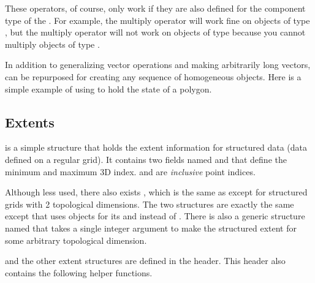 
These operators, of course, only work if they are also defined for the
component type of the . For example, the multiply operator will
work fine on objects of type , but the multiply
operator will not work on objects of type 
because you cannot multiply objects of type .

In addition to generalizing vector operations and making arbitrarily long
vectors,  can be repurposed for creating any sequence of
homogeneous objects. Here is a simple example of using  to hold
the state of a polygon.


\subsection{Extents}

 is a simple structure that holds the extent information for
structured data (data defined on a regular grid). It contains two
 fields named  and  that define the
minimum and maximum 3D index.  and  are
\emph{inclusive} point indices.

Although less used, there also exists , which is the same as
 except for structured grids with 2 topological
dimensions. The two structures are exactly the same except that
 uses  objects for its  and
 instead of . There is also a generic structure
named  that takes a single integer argument to make the
structured extent for some arbitrary topological dimension.

 and the other extent structures are defined in the
 header. This header also contains the following
helper functions.

